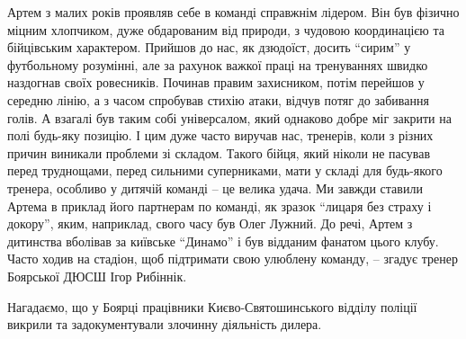 Артем з малих років проявляв себе в команді справжнім лідером. Він був
фізично міцним хлопчиком, дуже обдарованим від природи, з чудовою
координацією та бійцівським характером. Прийшов до нас, як дзюдоїст, досить
\enquote{сирим} у футбольному розумінні, але за рахунок важкої праці на тренуваннях
швидко наздогнав своїх ровесників. Починав правим захисником, потім
перейшов у середню лінію, а з часом спробував стихію атаки, відчув потяг до
забивання голів. А взагалі був таким собі універсалом, який однаково добре
міг закрити на полі будь-яку позицію. І цим дуже часто виручав нас,
тренерів, коли з різних причин виникали проблеми зі складом. Такого бійця,
який ніколи не пасував перед труднощами, перед сильними суперниками, мати у
складі для будь-якого тренера, особливо у дитячій команді – це велика
удача. Ми завжди ставили Артема в приклад його партнерам по команді, як
зразок \enquote{лицаря без страху і докору}, яким, наприклад, свого часу був Олег
Лужний. До речі, Артем з дитинства вболівав за київське \enquote{Динамо} і був
відданим фанатом цього клубу. Часто ходив на стадіон, щоб підтримати свою
улюблену команду, – згадує тренер Боярської ДЮСШ Ігор Рибіннік.

Нагадаємо, що у Боярці працівники Києво-Святошинського відділу поліції викрили
та задокументували злочинну діяльність дилера.

